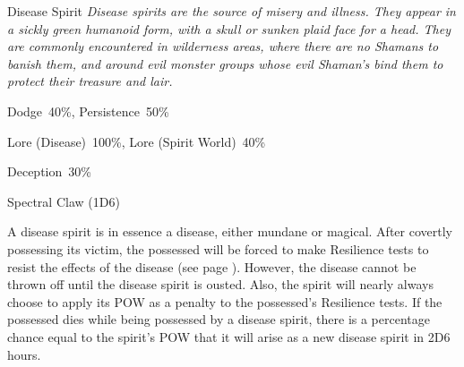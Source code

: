 \newpage

\begin{monsterbox}{Disease Spirit}
	\textit{Disease spirits are the source of misery and illness. They appear in a sickly green humanoid form, with a skull or sunken plaid face for a head.
They are commonly encountered in wilderness areas, where there are no Shamans to banish them, and around evil monster groups whose evil Shaman’s bind them to protect their treasure and lair.}\\
	\rpghline
	\basics[%
	powerpoints = 17,
	movementrate = 30m,
	plunderrating = 0
	]
	\rpghline%
	\stats[ %
		STR = -,
		CON = -,
		DEX = -,
		SIZ = -,
		INT = 2D6    (7),
		POW = 3D6+6  (17),
		CHA = 3D6    (11)
	]
	\rpghline%
	\begin{rpg-monsteraction}[Resistances]
		Dodge~40\%, Persistence~50\%
	\end{rpg-monsteraction}
	\begin{rpg-monsteraction}[Knowledge]
		Lore (Disease)~100\%, Lore (Spirit World)~40\%
	\end{rpg-monsteraction}
	\begin{rpg-monsteraction}[Practical]
		Deception~30\%
	\end{rpg-monsteraction}
	\begin{rpg-monsteraction}
		Spectral Claw (1D6)
	\end{rpg-monsteraction}
	\begin{rpg-monsteraction}
		A disease spirit is in essence a disease, either mundane or magical. After covertly possessing its victim, the possessed will be forced to make Resilience tests to resist the effects of the disease (see page \pageref{ssec:disease}). However, the disease cannot be thrown off until the disease spirit is ousted. Also, the spirit will nearly always choose to apply its POW as a penalty to the possessed’s Resilience tests.
		If the possessed dies while being possessed by a disease spirit, there is a percentage chance equal to the spirit’s POW that it will arise as a new disease spirit in 2D6 hours.
	\end{rpg-monsteraction}
\end{monsterbox}

\newpage 

